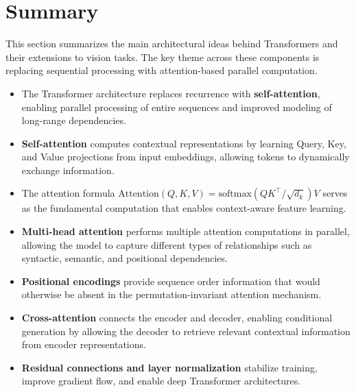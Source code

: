 \documentclass[11pt]{article}
\begin{document}
\section{Summary}

This section summarizes the main architectural ideas behind Transformers and their extensions to vision tasks. The key theme across these components is replacing sequential processing with attention-based parallel computation.

\begin{keytakeaway}

\begin{itemize}

\item The Transformer architecture replaces recurrence with \textbf{self-attention}, enabling parallel processing of entire sequences and improved modeling of long-range dependencies.

\item \textbf{Self-attention} computes contextual representations by learning Query, Key, and Value projections from input embeddings, allowing tokens to dynamically exchange information.

\item The attention formula 
$\text{Attention}(Q,K,V) = \text{softmax}(QK^\top / \sqrt{d_k})V$
serves as the fundamental computation that enables context-aware feature learning.

\item \textbf{Multi-head attention} performs multiple attention computations in parallel, allowing the model to capture different types of relationships such as syntactic, semantic, and positional dependencies.

\item \textbf{Positional encodings} provide sequence order information that would otherwise be absent in the permutation-invariant attention mechanism.

\item \textbf{Cross-attention} connects the encoder and decoder, enabling conditional generation by allowing the decoder to retrieve relevant contextual information from encoder representations.

\item \textbf{Residual connections and layer normalization} stabilize training, improve gradient flow, and enable deep Transformer architectures.


\end{itemize}
\end{keytakeaway}
\end{document}
